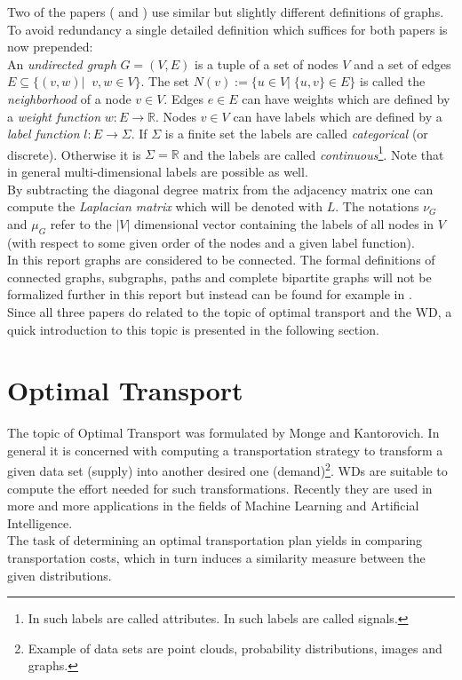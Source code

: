 \documentclass[twoside,twocolumn]{scrartcl}
\newcommand{\IR}{\mathbb{R}}
\begin{document}
Two of the papers (\cite{A} and \cite{B}) use similar but slightly different definitions of graphs. To avoid redundancy a single detailed definition which suffices for both papers is now prepended:\\
An \textit{undirected graph} $G=(V,E)$ is a tuple of a set of nodes $V$ and a set of edges $E\subseteq \{ (v,w)|\;\; v,w\in V \}$. The set $N(v):= \{ u\in V|\; \{u,v\}\in E \}$ is called the \textit{neighborhood} of a node $v\in V$. Edges $e\in E$ can have weights which are defined by a \textit{weight function} $w:E\to \IR$. 
Nodes $v\in V$ can have labels which are defined by a \textit{label function} $l:E\to \Sigma$. If $\Sigma$ is a finite set the labels are called \textit{categorical} (or discrete). Otherwise it is $\Sigma=\IR$ and the labels are called \textit{continuous}\footnote{In \cite{A} such labels are called attributes. In \cite{B} such labels are called signals.}. Note that in general multi-dimensional labels are possible as well.\\
By subtracting the diagonal degree matrix from the adjacency matrix one can compute the \textit{Laplacian matrix} which will be denoted with $L$. The notations $\nu_G$ and $\mu_G$ refer to the $|V|$ dimensional vector containing the labels of all nodes in $V$ (with respect to some given order of the nodes and a given label function).\\

In this report graphs are considered to be connected. The formal definitions of connected graphs, subgraphs, paths and complete bipartite graphs will not be formalized further in this report but instead can be found for example in \cite{discreteBible}.\\

Since all three papers do related to the topic of optimal transport and the WD, a quick introduction to this topic is presented in the following section. 


\section{Optimal Transport}

The topic of Optimal Transport was formulated by Monge and Kantorovich. In general it is concerned with computing a transportation strategy to transform a given data set (supply) into another desired one (demand)\footnote{Example of data sets are point clouds, probability distributions, images and graphs.}. WDs are suitable to compute the effort needed for such transformations. Recently they are used in more and more applications in the fields of Machine Learning and Artificial Intelligence.\\
The task of determining an optimal transportation plan yields in comparing transportation costs, which in turn induces a similarity measure between the given distributions.\\
\end{document}
